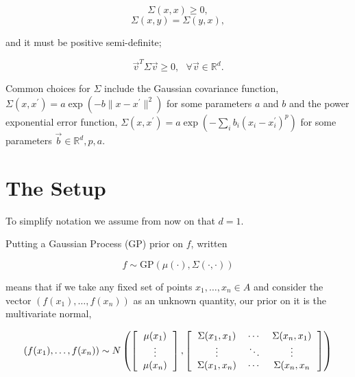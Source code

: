 \documentclass[phd,tocprelim]{cornell}
\begin{document}
\begin{equation}\Sigma(x,x) \geq 0,\end{equation}
\begin{equation}\Sigma(x,y) = \Sigma(y,x),\end{equation}

and it must be positive semi-definite;

\begin{equation}\vec{v}^{T}\Sigma \vec{v} \geq 0, \ \ \ \forall \vec{v} \in \mathbb{R}^{d}.\end{equation}

Common choices for $\Sigma$ include the Gaussian covariance function, $\Sigma(x,x^{\prime}) = a \exp(-b \| x - x^{\prime}\|^{2})$ for some parameters $a$ and $b$ and the power exponential error function, $\Sigma(x, x^{\prime}) = a \exp(-\sum_{i} b_{i} (x_{i} - x_{i}^{\prime})^{p})$ for some parameters $\vec{b} \in \mathbb{R}^{d}, p, a$.

\section{The Setup}

To simplify notation we assume from now on that $d = 1$.

Putting a Gaussian Process (GP) prior on $f$, written

\begin{equation}
 f \sim \mbox{GP}(\mu(\cdot), \Sigma(\cdot, \cdot))
\end{equation}

means that if we take any fixed set of points $x_{1}, \ldots, x_{n} \in A$ and consider the vector $(f(x_{1}), \ldots, f(x_{n}))$ as an unknown quantity, our prior on it is the multivariate normal,

\begin{equation}
(f(x_{1}), \ldots, f(x_{n})) \sim N\left( \left[ \begin{tabular}{c} $\mu(x_{1})$ \\ $\vdots$ \\ $\mu(x_{n})$ \end{tabular} \right] , \left[ \begin{tabular}{ccc} $\Sigma(x_{1}, x_{1})$ & $\cdots$ & $\Sigma(x_{n}, x_{1})$ \\ $\vdots$ & $\ddots$ & $\vdots$ \\ $\Sigma(x_{1}, x_{n})$ & $\cdots$ & $\Sigma(x_{n},x_{n}$ \end{tabular} \right] \right)
\end{equation}
\end{document}
